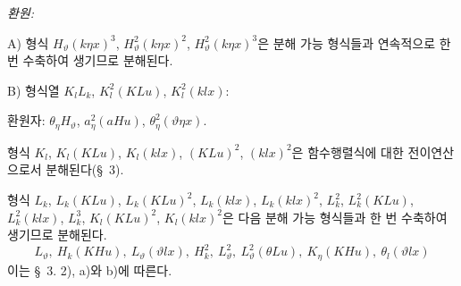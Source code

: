 
\noindent\emph{환원:}

A) 형식 $H_\vartheta(k\eta x)^3$, $H_\vartheta^2(k\eta x)^2$, $H_\vartheta^2(k\eta x)^3$은 분해 가능 형식들과 연속적으로 한 번 수축하여 생기므로 분해된다.

B) 형식열 $K_lL_k$, $K_l^2(KLu)$, $K_l^2(klx)$:

환원자: $\theta_\eta H_\vartheta$, $a_\eta^2(aHu)$, $\theta_\eta^2(\vartheta\eta x)$.

형식 $K_l$, $K_l(KLu)$, $K_l(klx)$, $(KLu)^2$, $(klx)^2$은 함수행렬식에 대한 전이연산으로서 분해된다(\S\ 3).

형식 $L_k$, $L_k(KLu)$, $L_k(KLu)^2$, $L_k(klx)$, $L_k(klx)^2$, $L_k^2$, $L_k^2(KLu)$, $L_k^2(klx)$, $L_k^3$, $K_l(KLu)^2$, $K_l(klx)^2$은 다음 분해 가능 형식들과 한 번 수축하여 생기므로 분해된다.
\[
L_\vartheta,
\ H_k(KHu),
\ L_\vartheta(\vartheta lx),
\ H_k^2,
\ L_\vartheta^2,
\ L_\vartheta^2(\theta Lu),
\ K_\eta(KHu),
\ \theta_l(\vartheta lx)
\]
이는 \S\ 3. 2), a)와 b)에 따른다.
